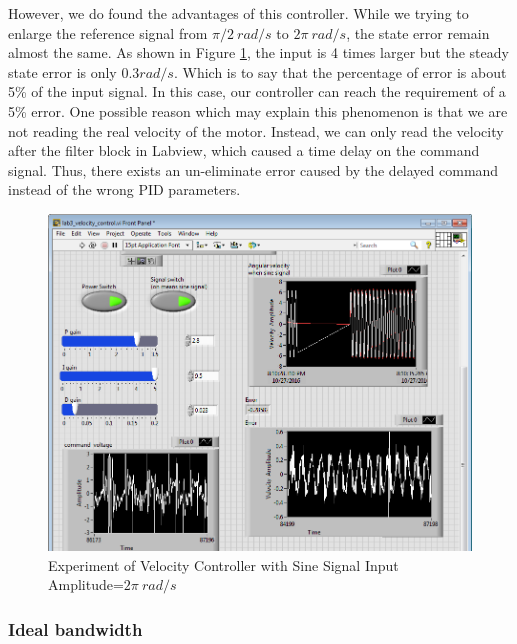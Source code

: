 \documentclass[letterpaper]{article}
\begin{document}
However, we do found the advantages of this controller. While we trying to enlarge the reference signal from $\pi /2 \ rad/s$ to $2\pi \ rad/s$, the state error remain almost the same. As shown in Figure \ref{velocity_control_sine_2pi_5hz}, the input is 4 times larger but the steady state error is only $0.3 rad/s$. Which is to say that the percentage of error is about 5\% of the input signal. In this case, our controller can reach the requirement of a 5\% error. One possible reason which may explain this phenomenon is that we are not reading the real velocity of the motor. Instead, we can only read the velocity after the filter block in Labview, which caused a time delay on the command signal. Thus, there exists an un-eliminate error caused by the delayed command instead of the wrong PID parameters. \\
\begin{figure}[H]
\begin{center}
\includegraphics[width = 15cm]{velocity_control_sine_2pi_5hz.PNG}
\caption{Experiment of Velocity Controller with Sine Signal Input Amplitude=$2\pi \ rad/s$}
\label{velocity_control_sine_2pi_5hz}
\end{center}
\end{figure}
\subsubsection*{Ideal bandwidth}
\end{document}
